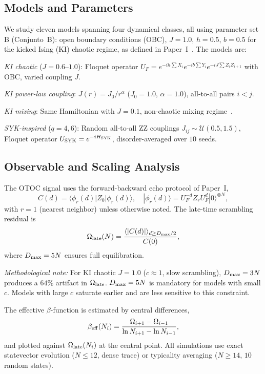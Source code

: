 \documentclass[aps,prl,twocolumn,showpacs,preprintnumbers,superscriptaddress]{revtex4-2}
\begin{document}
\subsection{Models and Parameters}

We study eleven models spanning four dynamical classes, all using
parameter set B (Conjunto~B): open boundary conditions (OBC),
$J = 1.0$, $h = 0.5$, $b = 0.5$ for the kicked Ising (KI) chaotic
regime, as defined in Paper~I~\cite{PerezEugenio2026a}.
The models are:

\emph{KI chaotic} ($J = 0.6$--$1.0$): Floquet operator
$U_F = e^{-ih\sum X_i} e^{-ib\sum Y_i} e^{-iJ\sum Z_i Z_{i+1}}$
with OBC, varied coupling $J$.

\emph{KI power-law coupling}: $J(r) = J_0/r^\alpha$ ($J_0 = 1.0$,
$\alpha = 1.0$), all-to-all pairs $i < j$.

\emph{KI mixing}: Same Hamiltonian with $J = 0.1$, non-chaotic mixing
regime~\cite{GarciaMata2026,Znidaric2024}.

\emph{SYK-inspired} ($q = 4, 6$): Random all-to-all ZZ couplings
$J_{ij} \sim \mathcal{U}(0.5, 1.5)$, Floquet operator
$U_{\rm SYK} = e^{-iH_{\rm SYK}}$, disorder-averaged over $10$ seeds.

\subsection{Observable and Scaling Analysis}

The OTOC signal uses the forward-backward echo protocol of Paper~I,
\begin{equation}
  C(d) = \langle \phi_r(d) | Z_0 | \phi_r(d) \rangle, \quad
  |\phi_r(d)\rangle = U_F^{-d} Z_r U_F^d |0\rangle^{\otimes N},
\end{equation}
with $r = 1$ (nearest neighbor) unless otherwise noted.
The late-time scrambling residual is
\begin{equation}
  \Omega_{\rm late}(N) = \frac{\langle |C(d)| \rangle_{d \geq D_{\rm max}/2}}{C(0)},
\end{equation}
where $D_{\rm max} = 5N$ ensures full equilibration.

\emph{Methodological note:} For KI chaotic $J = 1.0$ ($c \approx 1$,
slow scrambling), $D_{\rm max} = 3N$ produces a $64\%$ artifact in
$\Omega_{\rm late}$.
$D_{\rm max} = 5N$ is mandatory for models with small $c$.
Models with large $c$ saturate earlier and are less sensitive to this
constraint.

The effective $\beta$-function is estimated by central differences,
\begin{equation}
  \beta_{\rm eff}(N_i) = \frac{\Omega_{i+1} - \Omega_{i-1}}{\ln N_{i+1} - \ln N_{i-1}},
\end{equation}
and plotted against $\Omega_{\rm late}(N_i)$ at the central point.
All simulations use exact statevector evolution ($N \leq 12$, dense trace)
or typicality averaging ($N \geq 14$, $10$ random states).
\end{document}
